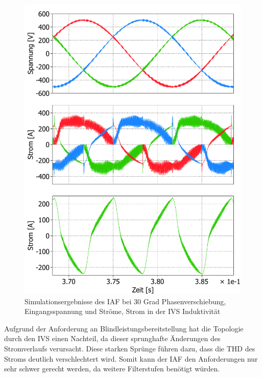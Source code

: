 \begin{figure}
	\centering
	\includegraphics[width=1\linewidth]{content/Grafiken/IAF_AC+L_30Grad}
	\caption{Simulationsergebnisse des IAF bei 30 Grad Phasenverschiebung, Eingangsspannung und Ströme, Strom in der IVS Induktivität }
	\label{fig:iafacl30grad}
\end{figure}
Aufgrund der Anforderung an Blindleistungsbereitstellung hat die Topologie durch den \gls{IVS} einen Nachteil, da dieser sprunghafte Änderungen des Stromverlaufs verursacht. Diese starken Sprünge führen dazu, dass die \gls{THD} des Stroms deutlich verschlechtert wird. Somit kann der \gls{IAF} den Anforderungen nur sehr schwer gerecht werden, da weitere Filterstufen benötigt würden.